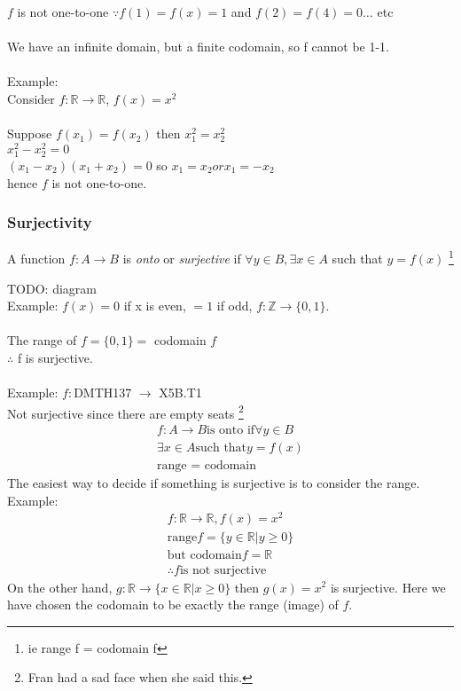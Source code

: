 $f$ is not one-to-one $\because f(1) = f(x) = 1$ and $f(2) = f(4) = 0\ldots$ etc \\
\\
We have an infinite domain, but a finite codomain, so f cannot be 1-1. \\
\\
Example: \\
Consider $f: \mathbb{R} \to \mathbb{R}$, $f(x) = x^2$ \\
\\
Suppose $f(x_1) = f(x_2)$ then $x_1^{2} = x_2^{2}$ \\
$x_1^2 - x_2^2 = 0$ \\
$(x_1 - x_2)(x_1 + x_2) = 0$ so $x_1 = x_2 or x_1 = -x_2$ \\
hence $f$ is not one-to-one. \\

\subsubsection{Surjectivity}
A function $f: A \to B $ is \emph{onto} or \emph{surjective} if $\forall y \in B, \exists x \in A$
such that $y = f(x)$ \footnote{ie range f = codomain f}

TODO: diagram \\
Example: $f(x) = 0$ if x is even, $=1$ if odd, $f: \mathbb{Z} \to \{0,1\}$. \\
\\
The range of $f = \{0,1\} = $ codomain $f$ \\
$\therefore$ f is surjective. \\
\\
Example: $f:$DMTH137 $\to$ X5B.T1 \\
Not surjective since there are empty seats \footnote{Fran had a sad face when she said this.}
\begin{align}
  f: A \to B \text{is onto if} \forall y \in B \\
  \exists x \in A \text{such that} y = f(x) \\
  \text{range = codomain}
\end{align}
The easiest way to decide if something is surjective is to consider the range.
Example:
\begin{align}
  f: \mathbb{R} \to \mathbb{R}, f(x) = x^2 \\
  \text{range} f = \{ y \in \mathbb{R} | y \geq 0 \} \\
  \text{but codomain} f = \mathbb{R} \\
  \therefore f \text{is not surjective}
\end{align}
On the other hand, $g: \mathbb{R} \to \{x \in \mathbb{R} | x \geq 0 \}$ then $g(x) = x^2$
is surjective. Here we have chosen the codomain to be exactly the range (image) of $f$.

